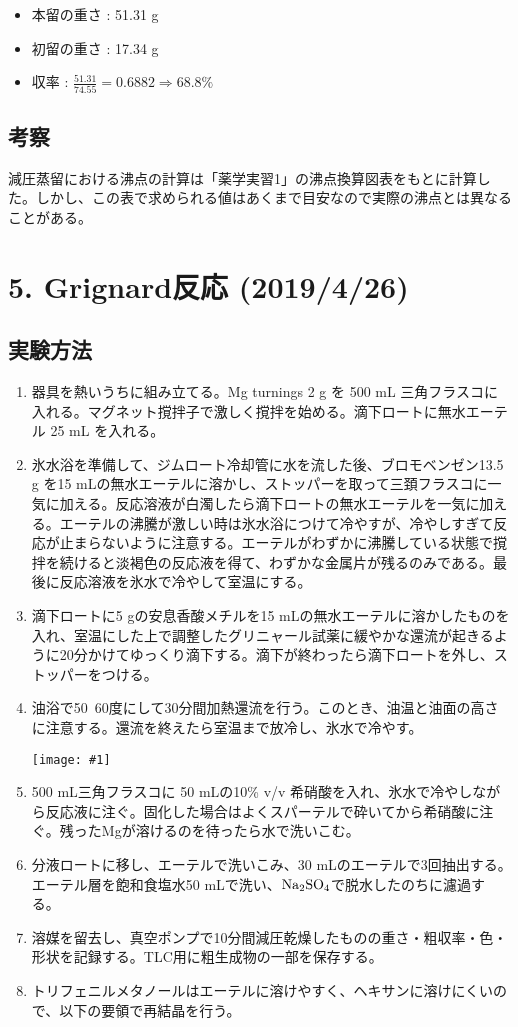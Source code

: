 \documentclass[a4paper,papersize,dvipdfmx]{jsarticle}
\newcommand{\pict}[2]{\begin{center} \texttt{[image: \#1]} \end{center}}   %
\begin{document}
\begin{itemize}
\item 本留の重さ : 51.31 g
\item 初留の重さ : 17.34 g
\item 収率 : $\frac{51.31}{74.55} = 0.6882 \Longrightarrow 68.8\%$
\end{itemize}
\subsection*{考察}
減圧蒸留における沸点の計算は「薬学実習1」の沸点換算図表をもとに計算した。しかし、この表で求められる値はあくまで目安なので実際の沸点とは異なることがある。


\section*{5. Grignard反応 (2019/4/26)}

\subsection*{実験方法}
\begin{enumerate}
\item 器具を熱いうちに組み立てる。Mg turnings 2 g を 500 mL 三角フラスコに入れる。マグネット撹拌子で激しく撹拌を始める。滴下ロートに無水エーテル 25 mL を入れる。
\item 氷水浴を準備して、ジムロート冷却管に水を流した後、ブロモベンゼン13.5 g を15 mLの無水エーテルに溶かし、ストッパーを取って三頚フラスコに一気に加える。反応溶液が白濁したら滴下ロートの無水エーテルを一気に加える。エーテルの沸騰が激しい時は氷水浴につけて冷やすが、冷やしすぎて反応が止まらないように注意する。エーテルがわずかに沸騰している状態で撹拌を続けると淡褐色の反応液を得て、わずかな金属片が残るのみである。最後に反応溶液を氷水で冷やして室温にする。
\item 滴下ロートに5 gの安息香酸メチルを15 mLの無水エーテルに溶かしたものを入れ、室温にした上で調整したグリニャール試薬に緩やかな還流が起きるように20分かけてゆっくり滴下する。滴下が終わったら滴下ロートを外し、ストッパーをつける。
\item 油浴で50~60度にして30分間加熱還流を行う。このとき、油温と油面の高さに注意する。還流を終えたら室温まで放冷し、氷水で冷やす。

\pict{imgs/5-zu.jpeg}{5}

\item 500 mL三角フラスコに 50 mLの10\% v/v 希硝酸を入れ、氷水で冷やしながら反応液に注ぐ。固化した場合はよくスパーテルで砕いてから希硝酸に注ぐ。残ったMgが溶けるのを待ったら水で洗いこむ。
\item 分液ロートに移し、エーテルで洗いこみ、30 mLのエーテルで3回抽出する。エーテル層を飽和食塩水50 mLで洗い、$\rm Na_2SO_4$で脱水したのちに濾過する。
\item 溶媒を留去し、真空ポンプで10分間減圧乾燥したものの重さ・粗収率・色・形状を記録する。TLC用に粗生成物の一部を保存する。
\item トリフェニルメタノールはエーテルに溶けやすく、ヘキサンに溶けにくいので、以下の要領で再結晶を行う。

\end{enumerate}
\end{document}
